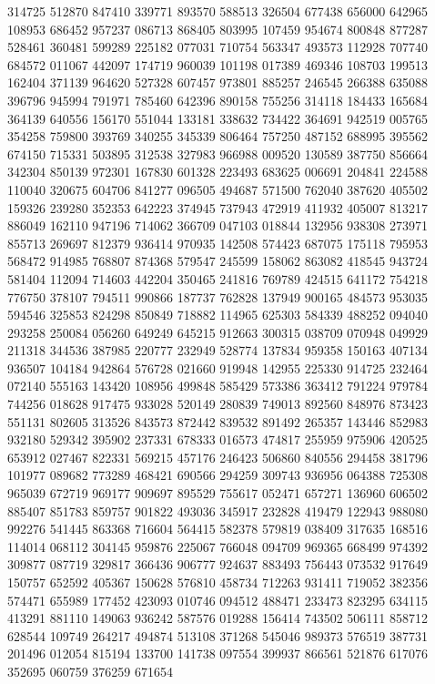 {314725 512870 847410 339771 893570 588513 326504 677438 656000 642965 108953%
686452 957237 086713 868405 803995 107459 954674 800848 877287 528461 360481%
599289 225182 077031 710754 563347 493573 112928 707740 684572 011067 442097%
174719 960039 101198 017389 469346 108703 199513 162404 371139 964620 527328%
607457 973801 885257 246545 266388 635088 396796 945994 791971 785460 642396%
890158 755256 314118 184433 165684 364139 640556 156170 551044 133181 338632%
734422 364691 942519 005765 354258 759800 393769 340255 345339 806464 757250%
487152 688995 395562 674150 715331 503895 312538 327983 966988 009520 130589%
387750 856664 342304 850139 972301 167830 601328 223493 683625 006691 204841%
224588 110040 320675 604706 841277 096505 494687 571500 762040 387620 405502%
159326 239280 352353 642223 374945 737943 472919 411932 405007 813217 886049%
162110 947196 714062 366709 047103 018844 132956 938308 273971 855713 269697%
812379 936414 970935 142508 574423 687075 175118 795953 568472 914985 768807%
874368 579547 245599 158062 863082 418545 943724 581404 112094 714603 442204%
350465 241816 769789 424515 641172 754218 776750 378107 794511 990866 187737%
762828 137949 900165 484573 953035 594546 325853 824298 850849 718882 114965%
625303 584339 488252 094040 293258 250084 056260 649249 645215 912663 300315%
038709 070948 049929 211318 344536 387985 220777 232949 528774 137834 959358%
150163 407134 936507 104184 942864 576728 021660 919948 142955 225330 914725%
232464 072140 555163 143420 108956 499848 585429 573386 363412 791224 979784%
744256 018628 917475 933028 520149 280839 749013 892560 848976 873423 551131%
802605 313526 843573 872442 839532 891492 265357 143446 852983 932180 529342%
395902 237331 678333 016573 474817 255959 975906 420525 653912 027467 822331%
569215 457176 246423 506860 840556 294458 381796 101977 089682 773289 468421%
690566 294259 309743 936956 064388 725308 965039 672719 969177 909697 895529%
755617 052471 657271 136960 606502 885407 851783 859757 901822 493036 345917%
232828 419479 122943 988080 992276 541445 863368 716604 564415 582378 579819%
038409 317635 168516 114014 068112 304145 959876 225067 766048 094709 969365%
668499 974392 309877 087719 329817 366436 906777 924637 883493 756443 073532%
917649 150757 652592 405367 150628 576810 458734 712263 931411 719052 382356%
574471 655989 177452 423093 010746 094512 488471 233473 823295 634115 413291%
881110 149063 936242 587576 019288 156414 743502 506111 858712 628544 109749%
264217 494874 513108 371268 545046 989373 576519 387731 201496 012054 815194%
133700 141738 097554 399937 866561 521876 617076 352695 060759 376259 671654%
}
